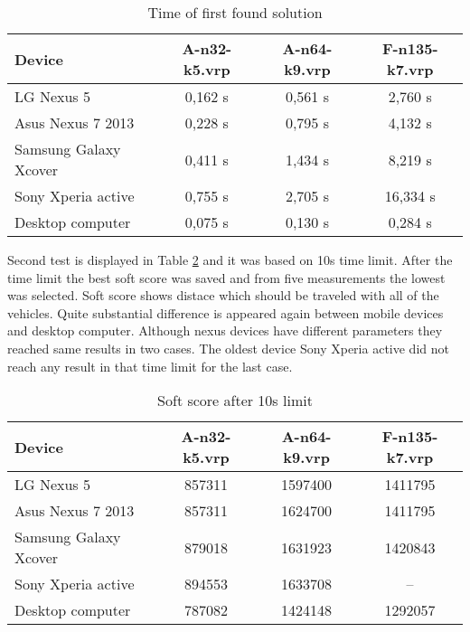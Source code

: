 \begin {table}[h!]
    \begin{tabular}{|l|c|c|c|}
        \hline
        \textbf{Device}       & \textbf{A-n32-k5.vrp} & \textbf{A-n64-k9.vrp} & \textbf{F-n135-k7.vrp} \\ \hline \hline
        LG Nexus 5            & 0,162 s               & 0,561 s               & 2,760 s                \\ \hline
        Asus Nexus 7 2013     & 0,228 s               & 0,795 s               & 4,132 s                \\ \hline
        Samsung Galaxy Xcover & 0,411 s               & 1,434 s               & 8,219 s                \\ \hline
        Sony Xperia active    & 0,755 s               & 2,705 s               & 16,334 s               \\ \hline
        Desktop computer      & 0,075 s               & 0,130 s               & 0,284 s                \\ \hline
    \end{tabular}
    \centering
    \caption{Time of first found solution}
    \label{FirstFoundTable}
\end{table}

Second test is displayed in Table \ref{ScoreLimitTable} and it was based on 10s time limit. After the time limit the
best soft score was saved and from five measurements the lowest was selected. Soft score shows distace which should be
traveled with all of the vehicles. Quite substantial difference is appeared again between mobile devices and desktop
computer. Although nexus devices have different parameters they reached same results in two cases. The oldest device
Sony Xperia active did not reach any result in that time limit for the last case.

\begin {table}[h!]
    \begin{tabular}{|l|c|c|c|}
        \hline
        \textbf{Device}       & \textbf{A-n32-k5.vrp} & \textbf{A-n64-k9.vrp} & \textbf{F-n135-k7.vrp} \\ \hline \hline
        LG Nexus 5            & 857311                & 1597400               & 1411795                \\ \hline
        Asus Nexus 7 2013     & 857311                & 1624700               & 1411795                \\ \hline
        Samsung Galaxy Xcover & 879018                & 1631923               & 1420843                \\ \hline
        Sony Xperia active    & 894553                & 1633708               & --                     \\ \hline
        Desktop computer      & 787082                & 1424148               & 1292057                \\ \hline
    \end{tabular}
    \centering
    \caption{Soft score after 10s limit}
    \label{ScoreLimitTable}
\end{table}

